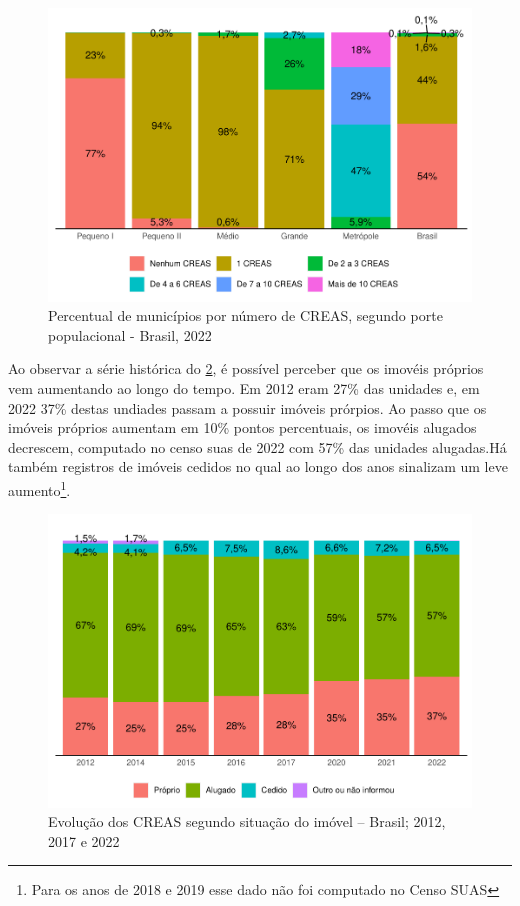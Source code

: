 \documentclass[
  brazilian]{report}
\begin{document}
\begin{figure}
\includegraphics{Censo-SUAS-2022_files/figure-latex/CREAS-porte-1} \caption[Percentual de municípios por número de CREAS, segundo porte populacional - Brasil, 2022]{Percentual de municípios por número de CREAS, segundo porte populacional - Brasil, 2022}\label{fig:CREAS-porte}
\end{figure}

Ao observar a série histórica do \cref{fig:creas-situacao}, é possível
perceber que os imovéis próprios vem aumentando ao longo do tempo. Em
2012 eram 27\% das unidades e, em 2022 37\% destas undiades passam a
possuir imóveis prórpios. Ao passo que os imóveis próprios aumentam em
10\% pontos percentuais, os imovéis alugados decrescem, computado no
censo suas de 2022 com 57\% das unidades alugadas.Há também registros de
imóveis cedidos no qual ao longo dos anos sinalizam um leve
aumento\footnote{Para os anos de 2018 e 2019 esse dado não foi computado no Censo SUAS}.

\begin{figure}
\includegraphics{Censo-SUAS-2022_files/figure-latex/creas-situacao-1} \caption[Evolução dos CREAS segundo situação do imóvel – Brasil]{Evolução dos CREAS segundo situação do imóvel – Brasil; 2012, 2017 e 2022}\label{fig:creas-situacao}
\end{figure}
\end{document}
